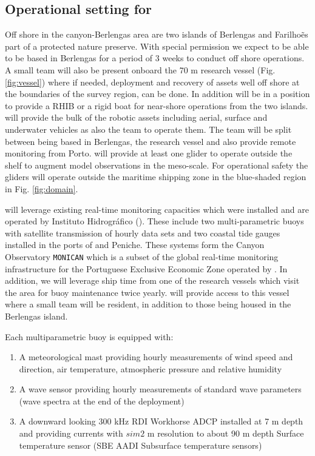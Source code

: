 \subsection{Operational setting for \proj}

Off shore in the \naz canyon-Berlengas area are two islands of
Berlengas and Farilho\~es part of a protected nature preserve. With
special permission we expect to be able to be based in Berlengas for a
period of 3 weeks to conduct off shore operations. A small team will
also be present onboard the 70 m \inst research vessel
(Fig. \ref{fig:vessel}) where if needed, deployment and recovery of
assets well off shore at the boundaries of the survey region, can be
done. In addition \inst will be in a position to provide a RHIB or a
rigid boat for near-shore operations from the two islands. \univ will
provide the bulk of the robotic assets including aerial, surface and
underwater vehicles as also the team to operate them. The team will be
split between being based in Berlengas, the research vessel and also
provide remote monitoring from Porto. \soc will provide at least one
glider to operate outside the shelf to augment model observations in
the meso-scale. For operational safety the gliders will operate
outside the maritime shipping zone in the blue-shaded region in
Fig. \ref{fig:domain}.

\proj will leverage existing real-time monitoring capacities which were
installed and are operated by Instituto Hidrogr\'{a}fico (\inste). These
include two multi-parametric buoys with satellite transmission of hourly
data sets and two coastal tide gauges installed in the ports of \naz and
Peniche. These systems form the \naz Canyon Observatory \texttt{MONICAN}
which is a subset of the global real-time monitoring infrastructure for
the Portuguese Exclusive Economic Zone operated by \inst {}. In addition, we will leverage ship
time from one of the \inst research vessels which visit the \naz area
for buoy maintenance twice yearly. \inst will provide access to this
vessel where a small \proj team will be resident, in addition to those
being housed in the Berlengas island.

Each multiparametric buoy is equipped with:

\begin{enumerate}[noitemsep,topsep=0pt,parsep=0pt,partopsep=0pt]

  \item A meteorological mast providing hourly measurements of wind speed and
    direction, air temperature, atmospheric pressure and relative
    humidity

  \item A wave sensor providing hourly measurements of standard wave parameters
    (wave spectra at the end of the deployment)

  \item A downward looking 300 kHz RDI Workhorse ADCP installed at 7 m
    depth and providing currents with $sim 2$ m resolution to about 90 m
    depth Surface temperature sensor (SBE AADI Subsurface temperature
    sensors)

\end{enumerate}  


